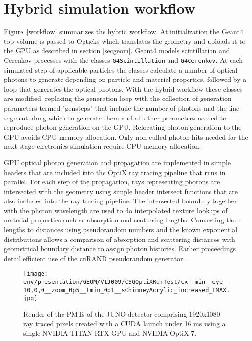 \documentclass{webofc}
\begin{document}
\section{Hybrid simulation workflow}%
\label{secworkflow}%
%
Figure~\ref{workflow} summarizes the hybrid workflow. 
At initialization the Geant4 top volume is passed to Opticks
which translates the geometry and uploads it to the GPU as described in section \ref{secgeom}.
%
Geant4 models scintillation and Cerenkov processes with the classes {\tt G4Scintillation} and {\tt G4Cerenkov}. 
At each simulated step of applicable particles the classes calculate a number of optical photons 
to generate depending on particle and material properties, followed by a loop that generates the optical photons. 
With the hybrid workflow these classes are modified, replacing the generation loop with the collection of 
generation parameters termed "gensteps" that include the number of photons and the line segment along which to generate them and all
other parameters needed to reproduce photon generation on the GPU. Relocating photon generation to the
GPU avoids CPU memory allocation. Only non-culled photon hits needed for the next stage electronics 
simulation require CPU memory allocation. 

GPU optical photon generation and propagation are implemented in simple headers that are included
into the OptiX ray tracing pipeline that runs in parallel. 
For each step of the propagation, rays representing photons are intersected
with the geometry using simple header intersect functions that are also included into the ray tracing pipeline.
The intersected boundary together with the photon wavelength are used to do interpolated texture lookups of
material properties such as absorption and scattering lengths.
Converting these lengths to distances using pseudorandom numbers and 
the known exponential distributions allows a comparison of absorption and scattering distances 
with geometrical boundary distance to assign photon histories. 
Earlier proceedings\cite{chep2016} detail efficient use of the cuRAND\cite{curandURL} pseudorandom generator.
%
%
\begin{figure}
\centering
\texttt{[image: env/presentation/GEOM/V1J009/CSGOptiXRdrTest/cxr\_min\_\_eye\_-10,0,0\_\_zoom\_0p5\_\_tmin\_0p1\_\_sChimneyAcrylic\_increased\_TMAX.jpg]}
\caption{Render of the PMTs of the JUNO detector comprising 1920x1080 ray traced pixels created with a CUDA launch under 16 ms 
using a single NVIDIA TITAN RTX GPU and NVIDIA OptiX 7.
\label{j1808}}
\vspace{-5mm}
\end{figure}
%
\end{document}
